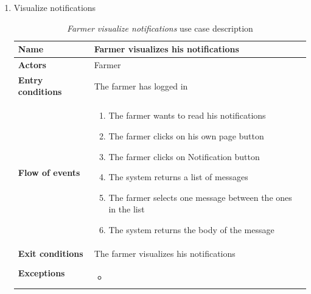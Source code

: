 \begin{enumerate}
    \item Visualize notifications
    \begin{longtable}{p{0.26\linewidth}p{0.75\linewidth}}
        \toprule
        \textbf{Name} & \textbf{Farmer visualizes his notifications} \\
        \midrule
        \textbf{Actors} & Farmer \\
        \midrule
        \textbf{Entry conditions} & The farmer has logged in\\
        \midrule
        \textbf{Flow of events} & 
        \begin{enumerate}
            \item The farmer wants to read his notifications
            \item The farmer clicks on his own page button
            \item The farmer clicks on Notification button
            \item The system returns a list of messages
            \item The farmer selects one message between the ones in the list
            \item The system returns the body of the message
        \end{enumerate} \\
        \midrule
        \textbf{Exit conditions} & The farmer visualizes his notifications\\
        \midrule
        \textbf{Exceptions} & 
        \begin{itemize}
            \item 
        \end{itemize}\\
        \bottomrule
        \caption{\emph{Farmer visualize notifications} use case description}
    \end{longtable}
    \begin{figure}[H]
        \begin{center}

\end{center}
\end{figure}
\end{enumerate}
